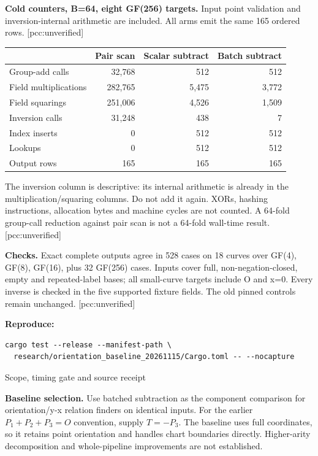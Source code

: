 \documentclass[10pt]{article}
\begin{document}
\textbf{Cold counters, B=64, eight GF(256) targets.} Input point validation and inversion-internal arithmetic are included. All arms emit the same 165 ordered rows. [pcc:unverified]
\begin{center}\begin{tabular}{lrrr}
& Pair scan & Scalar subtract & Batch subtract\\\hline
Group-add calls&32,768&512&512\\
Field multiplications&282,765&5,475&3,772\\
Field squarings&251,006&4,526&1,509\\
Inversion calls&31,248&438&7\\
Index inserts&0&512&512\\
Lookups&0&512&512\\
Output rows&165&165&165
\end{tabular}\end{center}
The inversion column is descriptive: its internal arithmetic is already in the multiplication/squaring columns. Do not add it again. XORs, hashing instructions, allocation bytes and machine cycles are not counted. A 64-fold group-call reduction against pair scan is not a 64-fold wall-time result. [pcc:unverified]

\textbf{Checks.} Exact complete outputs agree in 528 cases on 18 curves over GF(4), GF(8), GF(16), plus 32 GF(256) cases. Inputs cover full, non-negation-closed, empty and repeated-label bases; all small-curve targets include O and x=0. Every inverse is checked in the five supported fixture fields. The old pinned controls remain unchanged. [pcc:unverified]

\textbf{Reproduce:}
\begin{verbatim}
cargo test --release --manifest-path \
  research/orientation_baseline_20261115/Cargo.toml -- --nocapture
\end{verbatim}
\newpage
\begin{center}\Large Scope, timing gate and source receipt\end{center}
\textbf{Baseline selection.} Use batched subtraction as the component comparison for orientation/y-x relation finders on identical inputs. For the earlier $P_1+P_2+P_3=O$ convention, supply $T=-P_3$. The baseline uses full coordinates, so it retains point orientation and handles chart boundaries directly. Higher-arity decomposition and whole-pipeline improvements are not established.
\end{document}
